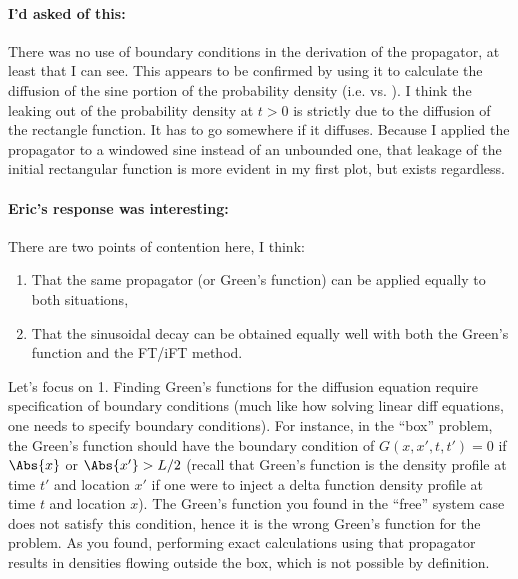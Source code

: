 {\paragraph{I'd asked of this:}

There was no use of boundary conditions in the derivation of the propagator, at least that I can see.  This appears to be confirmed by using it to calculate the diffusion of the sine portion of the probability density (i.e.  vs. ).  I think the leaking out of the probability density at $t > 0$ is strictly due to the diffusion of the rectangle function.  It has to go somewhere if it diffuses.  Because I applied the propagator to a windowed sine instead of an unbounded one, that leakage of the initial rectangular function is more evident in my first plot, but exists regardless.

\paragraph{Eric's response was interesting:}

There are two points of contention here, I think:

\begin{enumerate}
\item That the same propagator (or Green's function) can be applied equally to both situations, 
\item That the sinusoidal decay can be obtained equally well with both the Green's function and the FT/iFT method.
\end{enumerate}

Let's focus on 1.  Finding Green's functions for the diffusion equation require specification of boundary conditions (much like how solving linear diff equations, one needs to specify boundary conditions).  For instance, in the ``box'' problem, the Green's function should have the boundary condition of $G(x,x',t,t') = 0$ if $\Abs{x}$ or $\Abs{x'} > L/2$ (recall that Green's function is the density profile at time $t'$ and location $x'$ if one were to inject a delta function density profile at time $t$ and location $x$).  The Green's function you found in the ``free'' system case does not satisfy this condition, hence it is the wrong Green's function for the problem.  As you found, performing exact calculations using that propagator results in densities flowing outside the box, which is not possible by definition.

}

